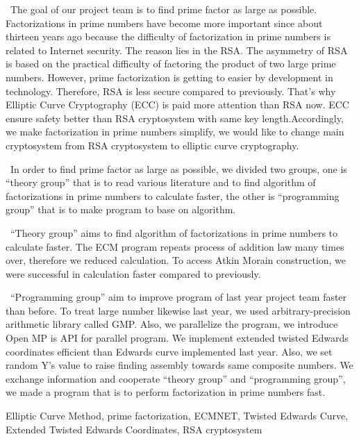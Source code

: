 \documentclass[openany,11pt,papersize]{jsbook}
\begin{document}
\begin{eabstract}

~The goal of our project team is to find prime factor as large as possible. Factorizations in prime numbers have become more important since about thirteen years ago because the difficulty of factorization in prime numbers is related to Internet security. The reason lies in the RSA. The asymmetry of RSA is based on the practical difficulty of factoring the product of two large prime numbers. However, prime factorization is getting to easier by development in technology. Therefore, RSA is less secure compared to previously. That's why Elliptic Curve Cryptography (ECC) is paid more attention than RSA now. ECC ensure safety better than RSA cryptosystem with same key length.Accordingly, we make factorization in prime numbers simplify, we would like to change main cryptosystem from RSA cryptosystem to elliptic curve cryptography.

~In order to find prime factor as large as possible, we divided two groups, one is “theory group” that is to read various literature and to find algorithm of factorizations in prime numbers to calculate faster, the other is “programming group” that is to make program to base on algorithm.

 ~“Theory group” aims to find algorithm of factorizations in prime numbers to calculate faster. The ECM program repeats process of addition law many times over, therefore we reduced calculation. To access Atkin Morain construction, we were successful in calculation faster compared to previously.

~“Programming group” aim to improve program of last year project team faster than before. To treat large number likewise last year, we used arbitrary-precision arithmetic library called GMP. Also, we parallelize the program, we introduce Open MP is API for parallel program. We implement extended twisted Edwards coordinates efficient than Edwards curve implemented last year. Also, we set random Y’s value to raise finding assembly towards same composite numbers.
 We exchange information and cooperate “theory group” and “programming group”, we made a program that is to perform factorization in prime numbers fast.
\begin{ekeyword}
Elliptic Curve Method, prime factorization, ECMNET, Twisted Edwards Curve, Extended Twisted Edwards Coordinates, RSA cryptosystem
\end{ekeyword}
\end{eabstract}
\end{document}
